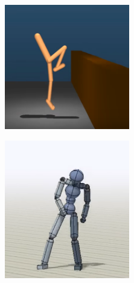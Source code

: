 \begin{frame}
\begin{figure}[!ht]
        \centering
        \begin{subfigure}{0.4\textwidth}
            \centering
            \href{https://youtu.be/hx_bgoTF7bs}{\includegraphics[width=0.6\textwidth]{./imgs/img_motivation_locomotion.png}}
            \caption{\cite{DeepmindEmergenceLocomotion}}
        \end{subfigure}
        \begin{subfigure}{0.4\textwidth}
            \centering
            \href{https://youtu.be/vppFvq2quQ0}{\includegraphics[width=0.6\textwidth]{./imgs/img_motivation_deepmimic.png}}
            \caption{\cite{DeepMimic}}
        \end{subfigure}
    \end{figure}
\end{frame}